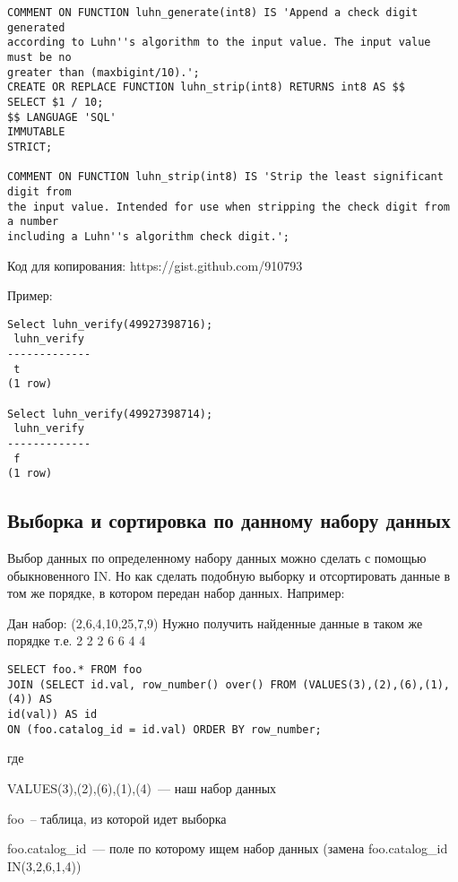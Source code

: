 \begin{lstlisting}[label=lst:snippets10,caption=Алгоритм Луна. SQL запрос]
COMMENT ON FUNCTION luhn_generate(int8) IS 'Append a check digit generated
according to Luhn''s algorithm to the input value. The input value must be no
greater than (maxbigint/10).';
CREATE OR REPLACE FUNCTION luhn_strip(int8) RETURNS int8 AS $$
SELECT $1 / 10;
$$ LANGUAGE 'SQL'
IMMUTABLE
STRICT;
 
COMMENT ON FUNCTION luhn_strip(int8) IS 'Strip the least significant digit from
the input value. Intended for use when stripping the check digit from a number
including a Luhn''s algorithm check digit.';
\end{lstlisting}

Код для копирования: https://gist.github.com/910793

Пример:
\begin{lstlisting}[label=lst:snippets11,caption=Алгоритм Луна. Пример]
Select luhn_verify(49927398716);
 luhn_verify 
-------------
 t
(1 row)

Select luhn_verify(49927398714);
 luhn_verify 
-------------
 f
(1 row)

\end{lstlisting}

\subsection{Выборка и сортировка по данному набору данных}
\begin{framed}
Выбор данных по определенному набору данных можно сделать с помощью обыкновенного IN. Но как сделать подобную выборку и отсортировать 
данные в том же порядке, в котором передан набор данных. Например:

Дан набор: (2,6,4,10,25,7,9)
Нужно получить найденные данные в таком же порядке т.е. 2 2 2 6 6 4 4
\end{framed}

\begin{lstlisting}[label=lst:snippets12,caption=Выборка и сортировка по данному набору данных. SQL запрос]
SELECT foo.* FROM foo                                           
JOIN (SELECT id.val, row_number() over() FROM (VALUES(3),(2),(6),(1),(4)) AS
id(val)) AS id
ON (foo.catalog_id = id.val) ORDER BY row_number;
\end{lstlisting}

где

VALUES(3),(2),(6),(1),(4)~--- наш набор данных

foo~-- таблица, из которой идет выборка

foo.catalog\_id~--- поле по которому ищем набор данных (замена foo.catalog\_id IN(3,2,6,1,4))

